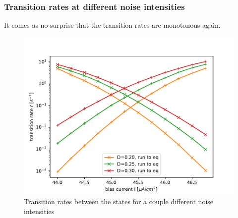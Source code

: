 \documentclass[12pt,a4paper]{article}
\begin{document}
\subsubsection{Transition rates at different noise intensities}
It comes as no surprise that the transition rates are monotonous again.
\begin{figure}[H]
	\centering
	\includegraphics[scale=1]{tranratesanhopf.pdf}\caption{Transition rates between the states for a couple different noise intensities}
	\label{tranrateanhopf}
\end{figure}
\end{document}

